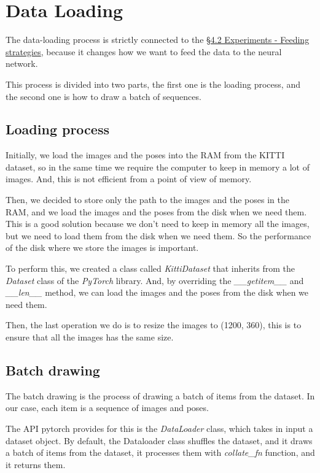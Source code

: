 \section{Data Loading}\label{sec:data-loading}
The data-loading process is strictly connected to the \hyperref[]{\S4.2 Experiments - Feeding strategies}, because it changes how we want to feed the data to the neural network.

This process is divided into two parts, the first one is the loading process, and the second one is how to draw a batch of sequences.

\subsection{Loading process}\label{subsec:loading-process}
Initially, we load the images and the poses into the RAM from the KITTI dataset, so in the same time we require the computer to keep in memory a lot of images.
And, this is not efficient from a point of view of memory.

Then, we decided to store only the path to the images and the poses in the RAM, and we load the images and the poses from the disk when we need them.
This is a good solution because we don't need to keep in memory all the images, but we need to load them from the disk when we need them.
So the performance of the disk where we store the images is important.

To perform this, we created a class called \textit{KittiDataset} that inherits from the \textit{Dataset} class of the \textit{PyTorch} library.
And, by overriding the \textit{\_\_getitem\_\_} and \textit{\_\_len\_\_} method, we can load the images and the poses from the disk when we need them.

Then, the last operation we do is to resize the images to (1200, 360), this is to ensure that all the images has the same size.

\subsection{Batch drawing}\label{subsec:batch-drawing}

The batch drawing is the process of drawing a batch of items from the dataset.
In our case, each item is a sequence of images and poses.

The API pytorch provides for this is the \textit{DataLoader} class, which takes in input a dataset object.
By default, the Dataloader class shuffles the dataset, and it draws a batch of items from the dataset, it processes them with \textit{collate\_fn} function, and it returns them.

